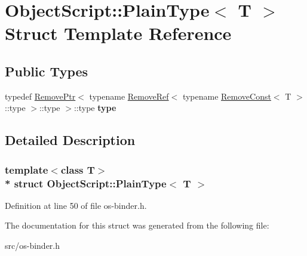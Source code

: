 \hypertarget{struct_object_script_1_1_plain_type}{}\section{Object\+Script\+:\+:Plain\+Type$<$ T $>$ Struct Template Reference}
\label{struct_object_script_1_1_plain_type}
\subsection*{Public Types}
\begin{DoxyCompactItemize}
\item 
typedef \hyperlink{struct_object_script_1_1_remove_ptr}{Remove\+Ptr}$<$ typename \hyperlink{struct_object_script_1_1_remove_ref}{Remove\+Ref}$<$ typename \hyperlink{struct_object_script_1_1_remove_const}{Remove\+Const}$<$ T $>$\+::type $>$\+::type $>$\+::type {\bfseries type}\hypertarget{struct_object_script_1_1_plain_type_a6de09a80aea48b97b03a8fe6ec0cfe0a}{}\label{struct_object_script_1_1_plain_type_a6de09a80aea48b97b03a8fe6ec0cfe0a}

\end{DoxyCompactItemize}


\subsection{Detailed Description}
\subsubsection*{template$<$class T$>$\\*
struct Object\+Script\+::\+Plain\+Type$<$ T $>$}



Definition at line 50 of file os-\/binder.\+h.



The documentation for this struct was generated from the following file\+:\begin{DoxyCompactItemize}
\item 
src/os-\/binder.\+h\end{DoxyCompactItemize}

